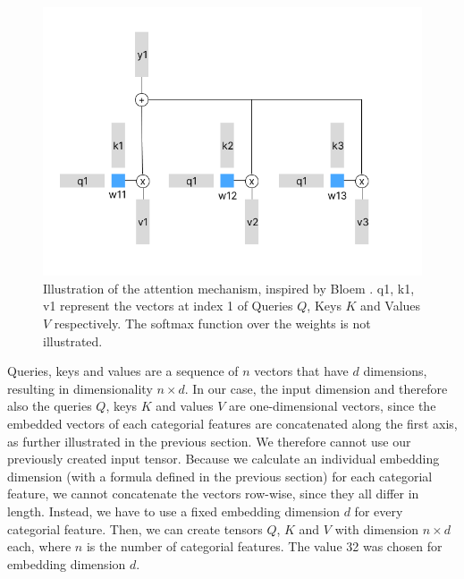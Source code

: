 \begin{figure}
	\includegraphics[width=0.9\linewidth]{attention_illustrated.png}
	\caption{Illustration of the attention mechanism, inspired by Bloem \cite{transformers_from_scratch}. q1, k1, v1 represent the vectors at index 1 of Queries $Q$, Keys $K$ and Values $V$ respectively. The softmax function over the weights is not illustrated.}
	\label{attention_illustrated}
\end{figure}

Queries, keys and values are a sequence of $n$ vectors that have $d$ dimensions, resulting in dimensionality $n \times d$. In our case, the input dimension and therefore also the queries $Q$, keys $K$ and values $V$ are one-dimensional vectors, since the embedded vectors of each categorial features are concatenated along the first axis, as further illustrated in the previous section. We therefore cannot use our previously created input tensor. Because we calculate an individual embedding dimension (with a formula defined in the previous section) for each categorial feature, we cannot concatenate the vectors row-wise, since they all differ in length. Instead, we have to use a fixed embedding dimension $d$ for every categorial feature. Then, we can create tensors $Q$, $K$ and $V$ with dimension $n \times d$ each, where $n$ is the number of categorial features. The value 32 was chosen for embedding dimension $d$.

